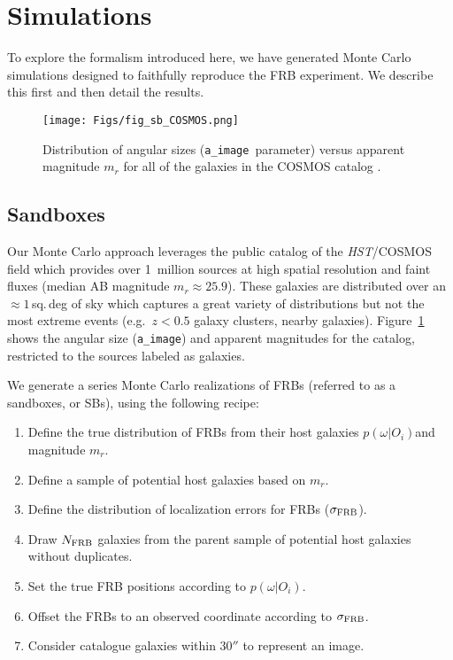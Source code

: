 \documentclass[twocolumn,linenumbers]{aastex63}
\newcommand{\msigmafrb}{\sigma_{\rm FRB}} %
\newcommand{\sigmafrb}{$\msigmafrb$}
\newcommand{\aimage}{\texttt{a\_image}}
\newcommand{\mpchance}{P^c}
\newcommand{\mipchance}{\mpchance_i}
\newcommand{\mpoffset}{p(\omega|O_i)}  %
\newcommand{\poffset}{$\mpoffset$}
\begin{document}
\section{Simulations}
\label{sec:sim}
To explore the formalism introduced here, we have generated
Monte Carlo simulations designed to faithfully reproduce
the FRB experiment.  We describe this first and then detail
the results.

\begin{figure}[!ht]
\centering
    \texttt{[image: Figs/fig\_sb\_COSMOS.png]}
    \caption{
    Distribution of angular sizes (\aimage\ parameter)
    versus apparent magnitude $m_r$ for all of the galaxies
    in the COSMOS catalog \citep{Scoville2007cosmoshst}.
    }
	\label{fig:cosmos}
\end{figure}


\subsection{Sandboxes}
\label{sec:sb}

Our Monte Carlo approach leverages the public catalog of 
the {\it HST}/COSMOS field \citep{Scoville2007cosmos, Scoville2007cosmoshst}
which provides over 1~million sources at high spatial
resolution and faint fluxes (median 
AB magnitude $m_r \approx 25.9$).
These galaxies are distributed over an $\approx 1$\,sq.\,deg
of sky which captures a great variety of distributions
but not the most extreme events 
(e.g.\ $z<0.5$ galaxy clusters, nearby galaxies). 
Figure~\ref{fig:cosmos} shows the angular size
(\aimage) and apparent magnitudes for the catalog,
restricted to the sources labeled as galaxies.

We generate a series Monte Carlo realizations of FRBs
(referred to as a sandboxes, or SBs), using the following
recipe:

\begin{enumerate}
    \item Define the true distribution of FRBs from their
    host galaxies \poffset and magnitude $m_r$.
    \item Define a sample of potential host galaxies based
    on $m_r$.%
    \item Define the distribution of localization errors for FRBs (\sigmafrb).
    \item Draw $N_{\rm FRB}$ galaxies from the parent
    sample of potential host galaxies without duplicates.
    \item Set the true FRB positions according to \poffset.
    \item Offset the FRBs to an observed coordinate according
    to \sigmafrb.
    \item Consider catalogue galaxies within $30''$ to represent an image.
\end{enumerate}
\end{document}
